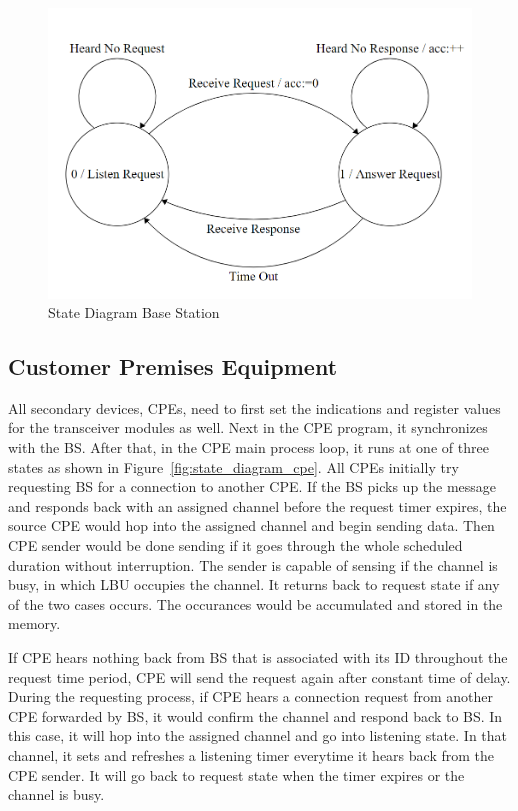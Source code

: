 \begin{figure}[ht]
\centering
\includegraphics[width=12cm]{figures/state_diagram_bs.png}
\caption{State Diagram Base Station}
\label{fig:state_diagram_bs}
\end{figure}


\subsection{Customer Premises Equipment}
All secondary devices, CPEs, need to first set the indications and register values for the transceiver modules as well. Next in the CPE program, it synchronizes with the BS. After that, in the CPE main process loop, it runs at one of three states as shown in Figure~\ref{fig:state_diagram_cpe}. All CPEs initially try requesting BS for a connection to another CPE. If the BS picks up the message and responds back with an assigned channel before the request timer expires, the source CPE would hop into the assigned channel and begin sending data. Then CPE sender would be done sending if it goes through the whole scheduled duration without interruption. The sender is capable of sensing if the channel is busy, in which LBU occupies the channel. It returns back to request state if any of the two cases occurs. The occurances would be accumulated and stored in the memory.

If CPE hears nothing back from BS that is associated with its ID throughout the request time period, CPE will send the request again after constant time of delay. During the requesting process, if CPE hears a connection request from another CPE forwarded by BS, it would confirm the channel and respond back to BS. In this case, it will hop into the assigned channel and go into listening state. In that channel, it sets and refreshes a listening timer everytime it hears back from the CPE sender. It will go back to request state when the timer expires or the channel is busy. 

